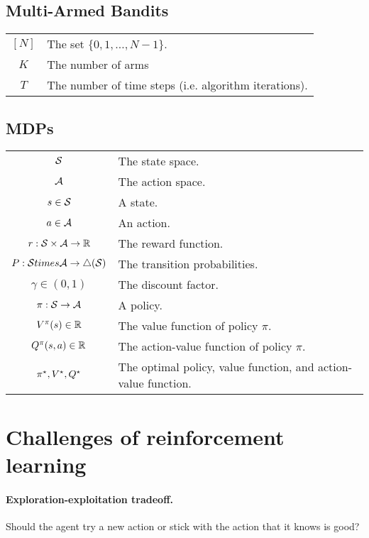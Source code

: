 \documentclass[\main/main]{subfiles}
\begin{document}
\subsection{Multi-Armed Bandits}

\begin{tabular}{cl}
    $[N]$ & The set $\{0, 1, \dots, N-1\}$. \\
    $K$ & The number of arms \\
    $T$ & The number of time steps (i.e. algorithm iterations). \\
\end{tabular}

\subsection{MDPs}

\begin{tabular}{cl}
$\S$ & The state space. \\
$\A$ & The action space. \\
$s \in \S$ & A state. \\
$a \in \A$ & An action. \\
$r : \S \times \A \to \R$ & The reward function. \\
$P : \S times \A \to \triangle(\S)$ & The transition probabilities. \\
$\gamma \in (0, 1)$ & The discount factor. \\
$\pi : \S \to \A$ & A policy. \\
$V^\pi(s) \in \R$ & The value function of policy $\pi$. \\
$Q^\pi(s, a) \in \R$ & The action-value function of policy $\pi$. \\
$\pi^\star, \Vopt, \Qopt$ & The optimal policy, value function, and action-value function. \\
\end{tabular}



\section{Challenges of reinforcement learning}

\paragraph{Exploration-exploitation tradeoff.} Should the agent try a new action or stick with the action that it knows is good?
\end{document}
